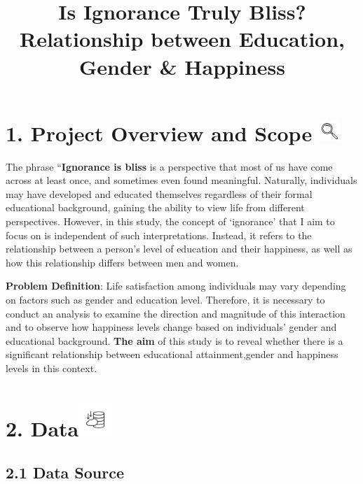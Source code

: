 \documentclass[
  11pt,
  a4paper,
  DIV=11,
  numbers=noendperiod]{scrartcl}
\title{Is Ignorance Truly Bliss? Relationship between Education, Gender
\& Happiness}
\author{}
\date{}
\begin{document}
\maketitle


\section[1. Project Overview and Scope \hfill
]{\texorpdfstring{1. Project Overview and Scope
\protect\includegraphics[width=0.3in,height=\textheight,keepaspectratio]{assets/images/scope.png}\hfill
}{1. Project Overview and Scope }}\label{project-overview-and-scope}

The phrase ``{\textbf{Ignorance is bliss}} is a perspective that most of
us have come across at least once, and sometimes even found meaningful.
Naturally, individuals may have developed and educated themselves
regardless of their formal educational background, gaining the ability
to view life from different perspectives. However, in this study, the
concept of `ignorance' that I aim to focus on is independent of such
interpretations. Instead, it refers to the relationship between a
person's level of education and their happiness, as well as how this
relationship differs between men and women.

{\textbf{Problem Definition}}: Life satisfaction among individuals may
vary depending on factors such as gender and education level. Therefore,
it is necessary to conduct an analysis to examine the direction and
magnitude of this interaction and to observe how happiness levels change
based on individuals' gender and educational background. {\textbf{The
aim}} of this study is to reveal whether there is a significant
relationship between educational attainment,gender and happiness levels
in this context.

\section[2. Data\hfill
]{\texorpdfstring{2.
Data\protect\includegraphics[width=0.5in,height=\textheight,keepaspectratio]{assets/images/data.png}\hfill
}{2. Data}}\label{data}

\subsection{2.1 Data Source}\label{data-source}
\end{document}
